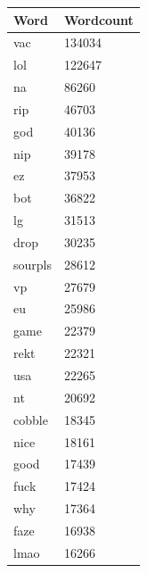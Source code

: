 \documentclass[final]{report}
\begin{document}
\begin{minipage}{.5\textwidth}
\centering
{}
\label{wordcounttabel}
\begin{tabular}{|l|l|}
\hline
Word    & Wordcount \\ \hline
vac     & 134034    \\ \hline
lol     & 122647    \\ \hline
na      & 86260     \\ \hline
rip     & 46703     \\ \hline
god     & 40136     \\ \hline
nip     & 39178     \\ \hline
ez      & 37953     \\ \hline
bot     & 36822     \\ \hline
lg      & 31513     \\ \hline
drop    & 30235     \\ \hline
sourpls & 28612     \\ \hline
vp      & 27679     \\ \hline
eu      & 25986     \\ \hline
game    & 22379     \\ \hline
rekt    & 22321     \\ \hline
usa     & 22265     \\ \hline
nt      & 20692     \\ \hline
cobble  & 18345     \\ \hline
nice    & 18161     \\ \hline
good    & 17439     \\ \hline
fuck    & 17424     \\ \hline
why     & 17364     \\ \hline
faze    & 16938     \\ \hline
lmao    & 16266     \\ \hline
\end{tabular}

\end{minipage}
\end{document}
